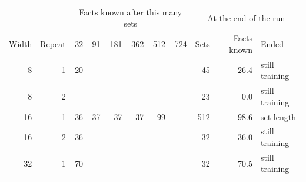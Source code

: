 \begin{tabular}{@{}rrrrrrrrrrl@{}}
\toprule
 & & \multicolumn{6}{c}{Facts known after this many sets} & \multicolumn{3}{c}{At the end of the run} \\
Width & Repeat & 32 & 91 & 181 & 362 & 512 & 724 & Sets & Facts known & Ended \\
\midrule
8 & 1 & 20 &  &  &  &  &  & 45 & 26.4 & still training \\
8 & 2 &  &  &  &  &  &  & 23 & 0.0 & still training \\
16 & 1 & 36 & 37 & 37 & 37 & 99 &  & 512 & 98.6 & set length \\
16 & 2 & 36 &  &  &  &  &  & 32 & 36.0 & still training \\
32 & 1 & 70 &  &  &  &  &  & 32 & 70.5 & still training \\
\bottomrule
\end{tabular}
